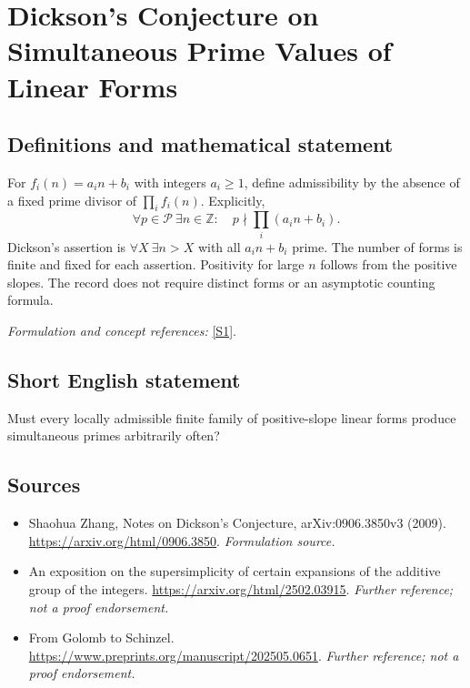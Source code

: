 \documentclass[11pt]{article}
\begin{document}
\section*{\texorpdfstring{Dickson's Conjecture on Simultaneous Prime Values of Linear Forms}{Dickson's Conjecture on Simultaneous Prime Values of Linear Forms}}\label{62}
\subsection{Definitions and mathematical statement}
For $f_i(n)=a_in+b_i$ with integers $a_i\ge1$, define admissibility by the absence of a fixed prime divisor of $\prod_i f_i(n)$. Explicitly,
\[
 \forall p\in\mathcal P\ \exists n\in{\mathbb{Z}}:\quad p\nmid\prod_i(a_in+b_i).
\]
Dickson's assertion is $\forall X\ \exists n>X$ with all $a_in+b_i$ prime. The number of forms is finite and fixed for each assertion. Positivity for large $n$ follows from the positive slopes. The record does not require distinct forms or an asymptotic counting formula.
\par\smallskip\textit{Formulation and concept references:} \href{https://arxiv.org/html/0906.3850}{[S1]}.

\subsection{Short English statement}
Must every locally admissible finite family of positive-slope linear forms produce simultaneous primes arbitrarily often?
\subsection{Sources}
\begin{itemize}
\item[S1]Shaohua Zhang, Notes on Dickson's Conjecture, arXiv:0906.3850v3 (2009).
\url{https://arxiv.org/html/0906.3850}.
\textit{Formulation source.}
\item[S2]An exposition on the supersimplicity of certain expansions of the additive group of the integers.
\url{https://arxiv.org/html/2502.03915}.
\textit{Further reference; not a proof endorsement.}
\item[S3]From Golomb to Schinzel.
\url{https://www.preprints.org/manuscript/202505.0651}.
\textit{Further reference; not a proof endorsement.}
\end{itemize}
\end{document}
